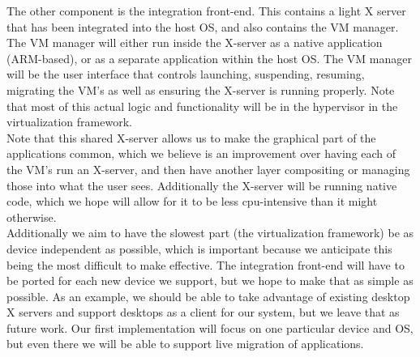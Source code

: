 The other component is the integration front-end.  This contains a light X server that has been integrated into the host OS, and also contains the VM manager.  The VM manager will either run inside the X-server as a native application (ARM-based), or as a separate application within the host OS.  The VM manager will be the user interface that controls launching, suspending, resuming, migrating the VM's as well as ensuring the X-server is running properly. Note that most of this actual logic and functionality will be in the hypervisor in the virtualization framework.\\

Note that this shared X-server allows us to make the graphical part of the applications common, which we believe is an improvement over having each of the VM's run an X-server, and then have another layer compositing or managing those into what the user sees.  Additionally the X-server will be running native code, which we hope will allow for it to be less cpu-intensive than it might otherwise. \\

Additionally we aim to have the slowest part (the virtualization framework) be as device independent as possible, which is important because we anticipate this being the most difficult to make effective.  The integration front-end will have to be ported for each new device we support, but we hope to make that as simple as possible.  As an example, we should be able to take advantage of existing desktop X servers and support desktops as a client for our system, but we leave that as future work.  Our first implementation will focus on one particular device and OS, but even there we will be able to support live migration of applications. \\
